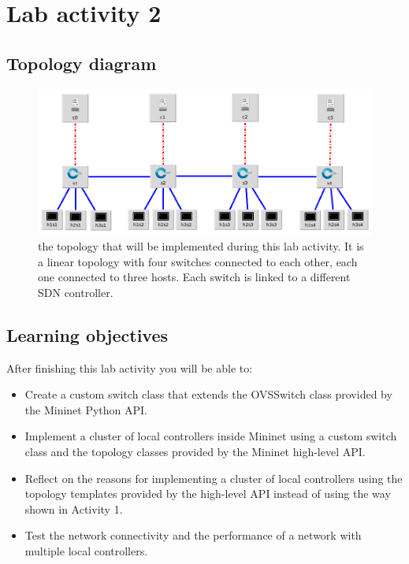 
\section*{Lab activity 2}

\subsection*{Topology diagram}
\begin{figure}[htb]
	\centering
	\includegraphics[width=1\linewidth]{img/topology-2.png}
	\caption{the topology that will be implemented during this lab activity.
  It is a linear topology with four switches connected to each other,
  each one connected to three hosts. Each switch is linked to a different
  SDN controller.}
	\label{fig:topology-2}
\end{figure}

\subsection*{Learning objectives}
After finishing this lab activity you will be able to:
\begin{itemize}
  \item Create a custom switch class that extends the OVSSwitch class provided
  by the Mininet Python API.
  \item Implement a cluster of local controllers inside Mininet using a custom
  switch class and the topology classes provided by the Mininet high-level API.
  \item Reflect on the reasons for implementing a cluster of local controllers
  using the topology templates provided by the high-level API instead of
  using the way shown in Activity 1.
  \item Test the network connectivity and the performance of a network with multiple
  local controllers.
\end{itemize}






